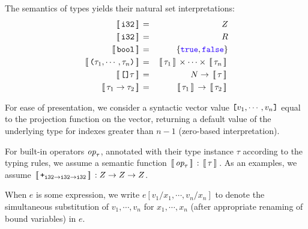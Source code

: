 \documentclass[oneside,11pt]{book}
\begin{document}
\newcommand{\Eval}[1]{\,\sem{\,#1\,}\,}
\newcommand{\extractF}[1]{\langle\,#1\,\rangle}
\newcommand{\Let}{\mathrm{let}}
\newcommand{\Where}[1]{\mathrm{where} \begin{array}[t]{l} #1 \end{array}}
\newcommand{\In}{\mathrm{in}}
\newcommand{\N}{N}
\newcommand{\Z}{Z}
\newcommand{\R}{R}
The semantics of types yields their natural set interpretations:
\begin{eqnarray*}
  \Eval{\kw{i32}} & = & \Z \\
  \Eval{\kw{i32}} & = & \R \\
  \Eval{\kw{bool}} & = & \{\fop{true},\fop{false}\} \\
  \Eval{\kw{(}\tau_1,\cdots,\tau_n\kw{)}} & = & \Eval{\tau_1} \times \cdots \times \Eval{\tau_n} \\
  \Eval{\kw{[]}\tau} & = & \N \rightarrow \Eval{\tau} \\
  \Eval{\tau_1 \rightarrow \tau_2} & = & \Eval{\tau_1} \rightarrow \Eval{\tau_2}
\end{eqnarray*}

For ease of presentation, we consider a syntactic vector value $\texttt{[}v_1,\cdots,v_n\texttt{]}$ equal to the projection function on the vector, returning a default value of the underlying type for indexes greater than $n-1$ (zero-based interpretation).

For built-in operators $\mbox{\it{op}}_\tau$, annotated with their type
instance $\tau$ according to the typing rules, we assume a semantic
function $\Eval{\id{op}_\tau} : \Eval{\tau}$. As an examples, we assume
$\Eval{\kw{+}_{\kw{i32}\rightarrow\kw{i32}\rightarrow\kw{i32}}} : \Z \rightarrow \Z \rightarrow \Z$.

When $e$ is some expression, we write $e[v_1/x_1,\cdots,v_n/x_n]$ to
denote the simultaneous substitution of $v_1,\cdots,v_n$ for
$x_1,\cdots,x_n$ (after appropriate renaming of bound variables) in
$e$.


\end{document}
